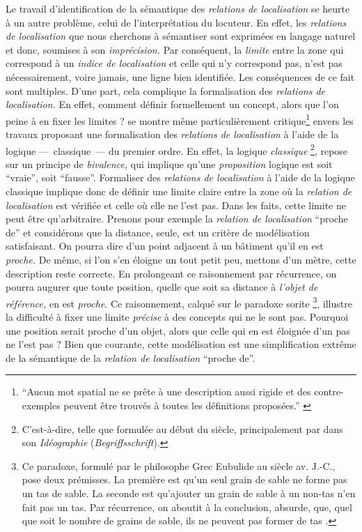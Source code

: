 Le travail d'identification de la sémantique des \emph{relations de
  localisation} se heurte à un autre problème, celui de
l'interprétation du locuteur. En effet, les \emph{relations de
  localisation} que nous cherchons à sémantiser sont exprimées en
langage naturel et donc, soumises à son \emph{imprécision.} Par
conséquent, la \emph{limite} entre la zone qui correspond à un
\emph{indice de localisation} et celle qui n'y correspond pas, n'est
pas nécessairement, voire jamais, une ligne bien identifiée. Les
conséquences de ce fait sont multiples. D'une part, cela complique la
formalisation des \emph{relations de localisation.} En effet, comment
définir formellement un concept, alors que l'on peine à en fixer les
limites ?  \textcite{Vandeloise1986} se montre même particulièrement
critique\footnote{\enquote{Aucun mot spatial ne se prête à une
    description aussi rigide et des contre-exemples peuvent être
    trouvés à toutes les définitions proposées.}
  \autocite[p. 18]{Vandeloise1986}} envers les travaux proposant une
formalisation des \emph{relations de localisation} à l'aide de la
logique ---~classique~--- du premier ordre. En effet, la logique
\emph{classique} \footnote{C'est-à-dire, telle que formulée au début
  du  siècle, principalement par  dans son
  \emph{Idéographie} (\emph{Begriffsschrift}).}, repose sur un
principe de \emph{bivalence,} qui implique qu'une \emph{proposition}
logique est soit \enquote{vraie}, soit \enquote{fausse}. Formaliser
des \emph{relations de localisation} à l'aide de la logique classique
implique donc de définir une limite claire entre la zone où la
\emph{relation de localisation} est vérifiée et celle où elle ne l'est
pas. Dans les faits, cette limite ne peut être qu'arbitraire. Prenons
pour exemple la \emph{relation de localisation} \enquote{proche de} et
considérons que la distance, seule, est un critère de modélisation
satisfaisant. On pourra dire d'un point adjacent à un bâtiment qu'il
en est \emph{proche.} De même, si l'on s'en éloigne un tout petit peu,
mettons d'un mètre, cette description reste correcte. En prolongeant
ce raisonnement par récurrence, on pourra augurer que toute position,
quelle que soit sa distance à \emph{l'objet de référence,} en est
\emph{proche}. Ce raisonnement, calqué sur le paradoxe sorite
\footnote{Ce paradoxe, formulé par le philosophe Grec Eubulide au
   siècle av. J.-C., pose deux prémisses. La première
  est qu'un seul grain de sable ne forme pas un tas de sable. La
  seconde est qu'ajouter un grain de sable à un non-tas n'en fait pas
  un tas. Par récurrence, on aboutit à la conclusion, absurde, que,
  quel que soit le nombre de grains de sable, ils ne peuvent pas
  former de tas \autocite{Sorensen2018,Hyde2018}.}, illustre la
difficulté à fixer une limite \emph{précise} à des concepts qui ne le
sont pas. Pourquoi une position serait proche d'un objet, alors que
celle qui en est éloignée d'un pas ne l'est pas ? Bien que courante,
cette modélisation est une simplification extrême de la sémantique de
la \emph{relation de localisation} \enquote{proche de}.

